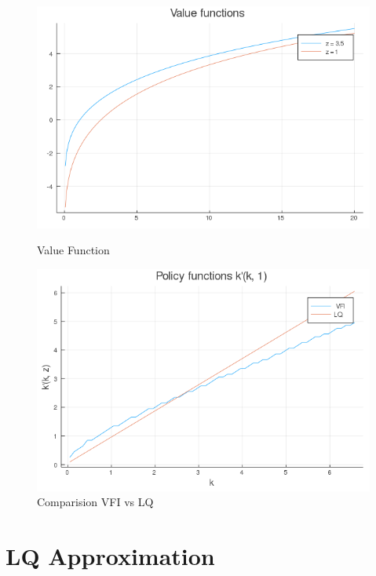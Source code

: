 \documentclass[12pt]{article}
\begin{document}
\begin{figure}[h]
    \centering
    \begin{minipage}{0.45\textwidth}
        \centering
        \includegraphics[width=1.2\textwidth]{value_fn_1_f.png} %
        \caption{Value Function}
    \end{minipage}\hfill
    \begin{minipage}{0.45\textwidth}
        \centering
        \includegraphics[width=1.2\textwidth]{cap_policy_VFI_LQ.png} %
        \caption{Comparision VFI vs LQ}
    \end{minipage}
\end{figure}

\newpage 

\section{LQ Approximation}
\end{document}

